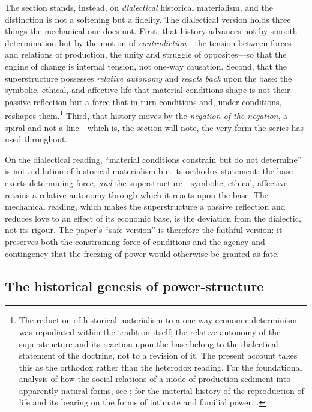 The section stands, instead, on \emph{dialectical} historical materialism, and the distinction is not a softening but a fidelity. The dialectical version holds three things the mechanical one does not. First, that history advances not by smooth determination but by the motion of \emph{contradiction}---the tension between forces and relations of production, the unity and struggle of opposites---so that the engine of change is internal tension, not one-way causation. Second, that the superstructure possesses \emph{relative autonomy} and \emph{reacts back} upon the base: the symbolic, ethical, and affective life that material conditions shape is not their passive reflection but a force that in turn conditions and, under conditions, reshapes them.\footnote{The reduction of historical materialism to a one-way economic determinism was repudiated within the tradition itself; the relative autonomy of the superstructure and its reaction upon the base belong to the dialectical statement of the doctrine, not to a revision of it. The present account takes this as the orthodox rather than the heterodox reading. For the foundational analysis of how the social relations of a mode of production sediment into apparently natural forms, see \textcite{marx1976}; for the material history of the reproduction of life and its bearing on the forms of intimate and familial power, \textcite{federici2004}.} Third, that history moves by the \emph{negation of the negation}, a spiral and not a line---which is, the section will note, the very form the series has used throughout.

\begin{claim}
On the dialectical reading, ``material conditions constrain but do not determine'' is not a dilution of historical materialism but its orthodox statement: the base exerts determining force, \emph{and} the superstructure---symbolic, ethical, affective---retains a relative autonomy through which it reacts upon the base. The mechanical reading, which makes the superstructure a passive reflection and reduces love to an effect of its economic base, is the deviation from the dialectic, not its rigour. The paper's ``safe version'' is therefore the faithful version: it preserves both the constraining force of conditions and the agency and contingency that the freezing of power would otherwise be granted as fate.
\end{claim}

\subsection{The historical genesis of power-structure}
\label{p17:sub:histmat-genesis}

